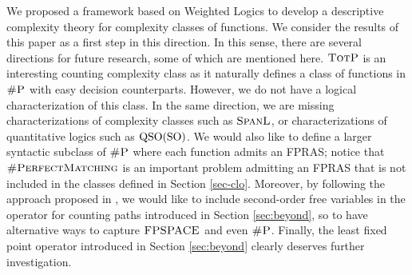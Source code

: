
We proposed a framework based on Weighted Logics to develop a descriptive complexity theory for complexity classes of functions.
We consider the results of this paper as a first step in this direction.
In this sense, there are several directions for future research, some of which are mentioned here. 
$\text{\sc TotP}$ is an interesting counting complexity class as it naturally defines a class of functions in $\text{\sc \#P}$ with easy decision counterparts. However, we do not have a logical characterization of this class.
In the same direction, we are missing characterizations of complexity classes such as $\text{\sc SpanL}$, or characterizations of quantitative logics such as ${\rm QSO}({\rm SO})$.
We would also like to define a larger syntactic subclass of $\text{\sc \#P}$ where each function admits an FPRAS; notice that $\textsc{\#PerfectMatching}$ is an important problem admitting an FPRAS\cite{JSV04} that is not included in the classes defined in Section \ref{sec-clo}. Moreover, by following the approach proposed in
\cite{I83}, we would like to include second-order free variables in the operator for counting paths introduced in Section \ref{sec:beyond}, so to have alternative ways to capture $\text{\sc FPSPACE}$ and even $\text{\sc \#P}$. Finally, the least fixed point operator introduced in Section \ref{sec:beyond} clearly deserves further investigation.


